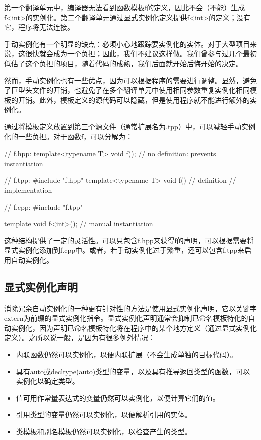 第一个翻译单元中，编译器无法看到函数模板f的定义，因此不会（不能）生成f<int>的实例化。第二个翻译单元通过显式实例化定义提供f<int>的定义；没有它，程序将无法连接。

手动实例化有一个明显的缺点：必须小心地跟踪要实例化的实体。对于大型项目来说，这很快就会成为一个负担；因此，我们不建议这样做。我们曾参与过几个最初低估了这个负担的项目，随着代码的成熟，我们后面就开始后悔开始的决定。

然而，手动实例化也有一些优点，因为可以根据程序的需要进行调整。显然，避免了巨型头文件的开销，也避免了在多个翻译单元中使用相同参数重复实例化相同模板的开销。此外，模板定义的源代码可以隐藏，但是使用程序就不能进行额外的实例化。

通过将模板定义放置到第三个源文件（通常扩展名为.tpp）中，可以减轻手动实例化的一些负担。对于函数f，可以分解为：

\begin{cpp}
// f.hpp:
template<typename T> void f(); // no definition: prevents instantiation

// f.tpp:
#include "f.hpp"
template<typename T> void f() { // definition
	// implementation
}

// f.cpp:
#include "f.tpp"

template void f<int>(); // manual instantiation
\end{cpp}

这种结构提供了一定的灵活性。可以只包含f.hpp来获得f的声明，可以根据需要将显式实例化添加到f.cpp中。或者，若手动实例化过于繁重，还可以包含f.tpp来启用自动实例化。

\subsection{显式实例化声明}

消除冗余自动实例化的一种更有针对性的方法是使用显式实例化声明，它以关键字extern为前缀的显式实例化指令。显式实例化声明通常会抑制已命名模板特化的自动实例化，因为声明已命名模板特化将在程序中的某个地方定义（通过显式实例化定义）。之所以说一般，是因为有很多例外情况：

\begin{itemize}
\item 
内联函数仍然可以实例化，以便内联扩展（不会生成单独的目标代码）。

\item 
具有auto或decltype(auto)类型的变量，以及具有推导返回类型的函数，可以实例化以确定类型。

\item 
值可用作常量表达式的变量仍然可以实例化，以便计算它们的值。

\item 
引用类型的变量仍然可以实例化，以便解析引用的实体。

\item 
类模板和别名模板仍然可以实例化，以检查产生的类型。
\end{itemize}

